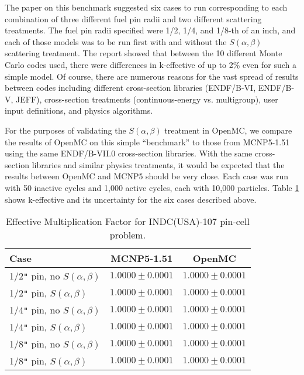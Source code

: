 \documentclass{elsarticle}
\begin{document}
The paper on this benchmark suggested six cases to run corresponding to each
combination of three different fuel pin radii and two different scattering
treatments. The fuel pin radii specified were 1/2, 1/4, and 1/8-th of an inch,
and each of those models was to be run first with and without the
$S(\alpha,\beta)$ scattering treatment. The report showed that between the 10
different Monte Carlo codes used, there were differences in k-effective of up to
2\% even for such a simple model. Of course, there are numerous reasons for the
vast spread of results between codes including different cross-section libraries
(ENDF/B-VI, ENDF/B-V, JEFF), cross-section treatments (continuous-energy
vs. multigroup), user input definitions, and physics algorithms.

For the purposes of validating the $S(\alpha,\beta)$ treatment in OpenMC, we
compare the results of OpenMC on this simple ``benchmark'' to those from
MCNP5-1.51 using the same ENDF/B-VII.0 cross-section libraries. With the same
cross-section libraries and similar physics treatments, it would be expected
that the results between OpenMC and MCNP5 should be very close. Each case was
run with 50 inactive cycles and 1,000 active cycles, each with 10,000
particles. Table \ref{tab:pincell} shows k-effective and its uncertainty for the
six cases described above.

\begin{table}
  \caption{Effective Multiplication Factor for INDC(USA)-107 pin-cell problem.}
  \label{tab:pincell}
  \begin{center}
  \begin{tabular}{ l c c }
    \hline
    Case & MCNP5-1.51 & OpenMC \\
    \hline
    1/2\verb+"+ pin, no $S(\alpha,\beta)$ & $1.0000 \pm 0.0001$ & $1.0000 \pm 0.0001$ \\
    1/2\verb+"+ pin, $S(\alpha,\beta)$    & $1.0000 \pm 0.0001$ & $1.0000 \pm 0.0001$ \\
    1/4\verb+"+ pin, no $S(\alpha,\beta)$ & $1.0000 \pm 0.0001$ & $1.0000 \pm 0.0001$ \\
    1/4\verb+"+ pin, $S(\alpha,\beta)$    & $1.0000 \pm 0.0001$ & $1.0000 \pm 0.0001$ \\
    1/8\verb+"+ pin, no $S(\alpha,\beta)$ & $1.0000 \pm 0.0001$ & $1.0000 \pm 0.0001$ \\
    1/8\verb+"+ pin, $S(\alpha,\beta)$    & $1.0000 \pm 0.0001$ & $1.0000 \pm 0.0001$ \\
    \hline
  \end{tabular}
  \end{center}
\end{table}
\end{document}
